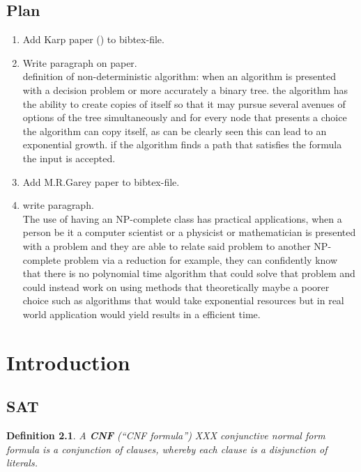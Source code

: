 \documentclass[a4paper]{report}
\newtheorem{defi}{Definition}[section]
\begin{document}
\section{Plan}
\label{sec:Plan}

\begin{enumerate}
\item Add Karp paper (\cite{Karp1972NP}) to bibtex-file.
\item Write paragraph on paper.\\
definition of non-deterministic algorithm: when an algorithm is presented with a decision problem or more accurately a binary tree. the algorithm has the ability to create copies of itself so that it may pursue several avenues of options of the tree simultaneously and for every node that presents a choice the algorithm can copy itself, as can be clearly seen this can lead to an exponential growth. if the algorithm finds a path that satisfies the formula the input is accepted. \cite{Karp1972NP}
\item Add M.R.Garey paper \cite{MRGarey1976} to bibtex-file.
\item write paragraph.\\
The use of having an NP-complete class has practical applications, when a person be it a computer scientist or a physicist or mathematician is presented with a problem and they are able to relate said problem to another NP-complete problem via a reduction for example, they can confidently know that there is no polynomial time algorithm that could solve that problem and could instead work on using methods that theoretically maybe a poorer choice such as algorithms that would take exponential resources but in real world application would yield results in a efficient time.\cite{MRGarey1976}

\end{enumerate}



\chapter{Introduction}
\label{cha:Introduction}

\section{SAT}
\label{sec:BackgroundSAT}

\begin{defi}\label{def:CNF}
  A \textbf{CNF} (``CNF formula'')  XXX  conjunctive normal form formula is a conjunction of clauses, whereby each clause is a disjunction of literals.
\end{defi}
\end{document}

